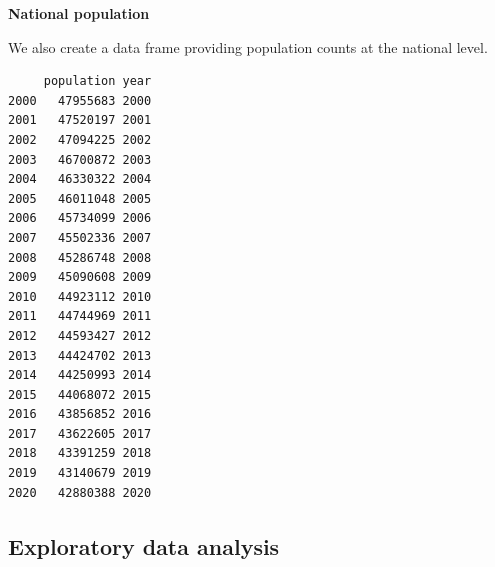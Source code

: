 \documentclass[
  letterpaper,
  DIV=11,
  numbers=noendperiod]{scrreprt}
\newenvironment{Shaded}{\begin{snugshade}}{\end{snugshade}}
\newcommand{\AttributeTok}[1]{\textcolor[rgb]{0.40,0.45,0.13}{#1}}
\newcommand{\CommentTok}[1]{\textcolor[rgb]{0.37,0.37,0.37}{#1}}
\newcommand{\ConstantTok}[1]{\textcolor[rgb]{0.56,0.35,0.01}{#1}}
\newcommand{\DecValTok}[1]{\textcolor[rgb]{0.68,0.00,0.00}{#1}}
\newcommand{\FunctionTok}[1]{\textcolor[rgb]{0.28,0.35,0.67}{#1}}
\newcommand{\NormalTok}[1]{\textcolor[rgb]{0.00,0.23,0.31}{#1}}
\newcommand{\OtherTok}[1]{\textcolor[rgb]{0.00,0.23,0.31}{#1}}
\newcommand{\SpecialCharTok}[1]{\textcolor[rgb]{0.37,0.37,0.37}{#1}}
\newcommand{\StringTok}[1]{\textcolor[rgb]{0.13,0.47,0.30}{#1}}
\begin{document}
\textbf{National population}

We also create a data frame providing population counts at the national
level.

\begin{Shaded}
\end{Shaded}

\begin{verbatim}
     population year
2000   47955683 2000
2001   47520197 2001
2002   47094225 2002
2003   46700872 2003
2004   46330322 2004
2005   46011048 2005
2006   45734099 2006
2007   45502336 2007
2008   45286748 2008
2009   45090608 2009
2010   44923112 2010
2011   44744969 2011
2012   44593427 2012
2013   44424702 2013
2014   44250993 2014
2015   44068072 2015
2016   43856852 2016
2017   43622605 2017
2018   43391259 2018
2019   43140679 2019
2020   42880388 2020
\end{verbatim}

\hypertarget{exploratory-data-analysis}{%
\subsection{Exploratory data analysis}\label{exploratory-data-analysis}}
\end{document}
